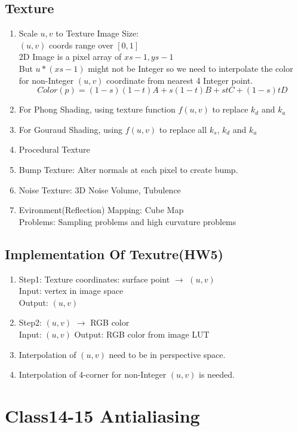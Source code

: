 \documentclass[geye,cyan,normal,en]{elegantnote}
\begin{document}
\subsection{Texture}
\begin{enumerate}
	\item Scale $u,v$ to Texture Image Size:\\
	$(u,v)$ coords range over $[0,1]$\\
	2D Image is a pixel array of $xs-1,ys-1$\\
	But $u*(xs-1)$ might not be Integer so we need to interpolate the color for non-Integer $(u,v)$ coordinate from nearest 4 Integer point.
	$$Color(p)=(1-s)(1-t)A+s(1-t)B+stC+(1-s)tD$$
	\item For Phong Shading, using texture function $f(u,v)$ to replace $k_d$ and $k_a$
	\item For Gouraud Shading, using $f(u,v)$ to replace all $k_s$, $k_d$ and $k_a$
	\item Procedural Texture
	\item Bump Texture: Alter normals at each pixel to create bump.
	\item Noise Texture: 3D Noise Volume, Tubulence
	\item Evironment(Reflection) Mapping: Cube Map\\
	Problems: Sampling problems and high curvature problems
\end{enumerate}
\subsection{Implementation Of Texutre(HW5)}
\begin{enumerate}
	\item Step1: Texture coordinates: surface point $\rightarrow$ $(u,v)$\\
	Input: vertex in image space\\
	Output: $(u,v)$
	\item Step2: $(u,v)$ $\rightarrow$ RGB color\\
	Input: $(u,v)$
	Output: RGB color from image LUT
	\item Interpolation of $(u,v)$ need to be in perspective space.
	\item Interpolation of 4-corner for non-Integer $(u,v)$ is needed.
\end{enumerate}
\newpage

\section{Class14-15 Antialiasing}
\end{document}
